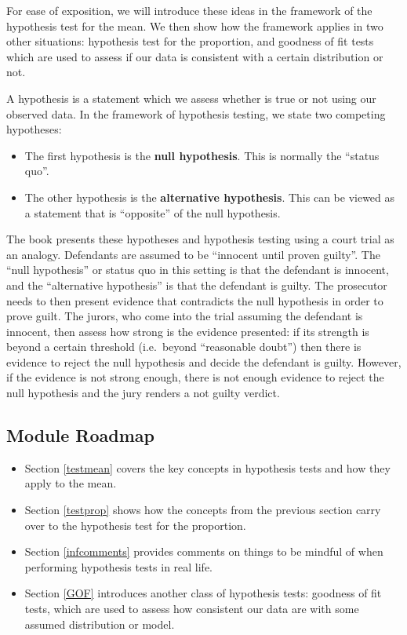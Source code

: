 \documentclass[
]{book}
\providecommand{\tightlist}{%
  \setlength{\itemsep}{0pt}\setlength{\parskip}{0pt}}
\begin{document}
For ease of exposition, we will introduce these ideas in the framework of the hypothesis test for the mean. We then show how the framework applies in two other situations: hypothesis test for the proportion, and goodness of fit tests which are used to assess if our data is consistent with a certain distribution or not.

A hypothesis is a statement which we assess whether is true or not using our observed data. In the framework of hypothesis testing, we state two competing hypotheses:

\begin{itemize}
\item
  The first hypothesis is the \textbf{null hypothesis}. This is normally the ``status quo''.
\item
  The other hypothesis is the \textbf{alternative hypothesis}. This can be viewed as a statement that is ``opposite'' of the null hypothesis.
\end{itemize}

The book presents these hypotheses and hypothesis testing using a court trial as an analogy. Defendants are assumed to be ``innocent until proven guilty''. The ``null hypothesis'' or status quo in this setting is that the defendant is innocent, and the ``alternative hypothesis'' is that the defendant is guilty. The prosecutor needs to then present evidence that contradicts the null hypothesis in order to prove guilt. The jurors, who come into the trial assuming the defendant is innocent, then assess how strong is the evidence presented: if its strength is beyond a certain threshold (i.e.~beyond ``reasonable doubt'') then there is evidence to reject the null hypothesis and decide the defendant is guilty. However, if the evidence is not strong enough, there is not enough evidence to reject the null hypothesis and the jury renders a not guilty verdict.

\hypertarget{module-roadmap-7}{%
\subsection{Module Roadmap}\label{module-roadmap-7}}

\begin{itemize}
\tightlist
\item
  Section \ref{testmean} covers the key concepts in hypothesis tests and how they apply to the mean.
\item
  Section \ref{testprop} shows how the concepts from the previous section carry over to the hypothesis test for the proportion.
\item
  Section \ref{infcomments} provides comments on things to be mindful of when performing hypothesis tests in real life.
\item
  Section \ref{GOF} introduces another class of hypothesis tests: goodness of fit tests, which are used to assess how consistent our data are with some assumed distribution or model.
\end{itemize}
\end{document}
